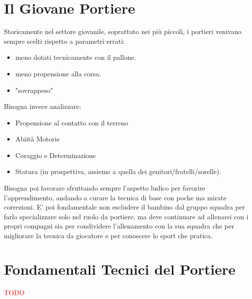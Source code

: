 \documentclass[../uefaC.tex]{subfiles}
\begin{document}
\section{Il Giovane Portiere}
Storicamente nel settore giovanile, soprattuto nei più piccoli, i portieri venivano sempre scelti rispetto a parametri errati:
\begin{itemize}
    \item meno dotati tecnicamente con il pallone.
    \item meno propensione alla corsa.
    \item "sovrappeso"
\end{itemize}
Bisogna invece analizzare:
\begin{itemize}
    \item Propensione al contatto con il terreno
    \item Abiità Motorie
    \item Coraggio e Determinazione 
    \item Statura (in prospettiva, assieme a quella dei genitori/fratelli/sorelle).
\end{itemize}
Bisogna poi lavorare sfruttando sempre l'aspetto ludico per favorire l'apprendimento, andando a curare la tecnica di base con poche ma mirate correzioni. E' poi fondamentale non escludere il bambino dal gruppo squadra per farlo specializzare solo nel ruolo da portiere, ma deve continuare ad allenarsi con i propri compagni sia per condividere l'allenamento con la sua squadra che per migliorare la tecnica da giocatore e per conoscere lo sport che pratica.

\section{Fondamentali Tecnici del Portiere}
\textcolor{red}{TODO}
\end{document}
